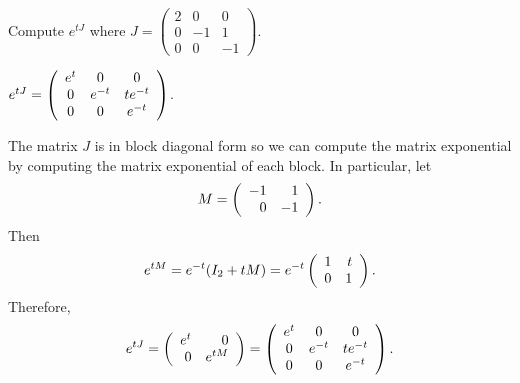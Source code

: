 \documentclass{ximera}
\begin{document}
\begin{exercise}  \label{c10.5.5A}
Compute $e^{tJ}$ where $J=\left(\begin{array}{rrr} 2 & 0 & 0 \\  0 & -1 & 1 \\
0 & 0 & -1 \end{array}\right)$.

\begin{solution}
\ans $e^{tJ} =
\left(\begin{array}{ccc} e^t & 0 & 0 \\ 0 & e^{-t} & te^{-t} \\ 0 & 0 & e^{-t}\end{array}\right)$.

\soln The matrix $J$ is in block diagonal form so we can compute the matrix exponential 
by computing the matrix exponential of each block.  In particular, let 
\[
M = \left(\begin{array}{rr} -1 & 1\\ 0 &-1\end{array}\right).
\]
Then 
\[
e^{tM} = e^{-t}(I_2+tM) = e^{-t}\left(\begin{array}{rr} 1 & t\\ 0 &1\end{array}\right).
\]
Therefore,
\[
e^{tJ} = \left(\begin{array}{rr} e^t & 0\\ 0 &e^{tM}\end{array}\right) = 
\left(\begin{array}{ccc} e^t & 0 & 0 \\ 0 & e^{-t} & te^{-t} \\ 0 & 0 & e^{-t}\end{array}\right).
\]

\end{solution}
\end{exercise}
\end{document}
